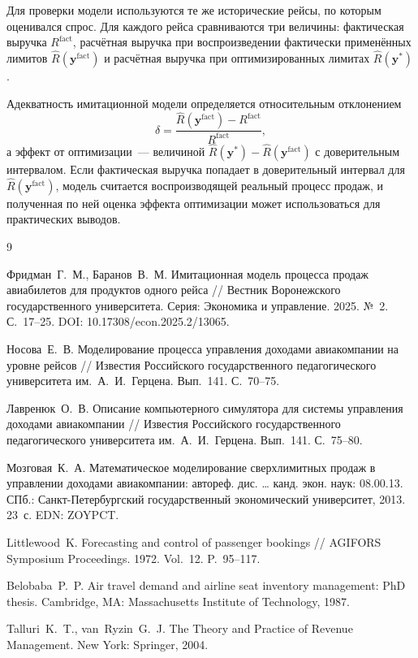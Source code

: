 \documentclass{misisarticle}
\begin{document}
Для проверки модели используются те же исторические рейсы, по которым оценивался спрос. Для каждого рейса сравниваются три величины: фактическая выручка $R^{\text{fact}}$, расчётная выручка при воспроизведении фактически применённых лимитов $\hat{R}(\mathbf{y}^{\text{fact}})$ и расчётная выручка при оптимизированных лимитах $\hat{R}(\mathbf{y}^{*})$.

Адекватность имитационной модели определяется относительным отклонением
\begin{equation}
  \delta = \frac{\hat{R}(\mathbf{y}^{\text{fact}}) - R^{\text{fact}}}{R^{\text{fact}}},
  \label{eq:delta}
\end{equation}
а эффект от оптимизации~--- величиной $\hat{R}(\mathbf{y}^{*}) - \hat{R}(\mathbf{y}^{\text{fact}})$ с доверительным интервалом. Если фактическая выручка попадает в доверительный интервал для $\hat{R}(\mathbf{y}^{\text{fact}})$, модель считается воспроизводящей реальный процесс продаж, и полученная по ней оценка эффекта оптимизации может использоваться для практических выводов.

\begin{thebibliography}{9}

 Фридман~Г.~М., Баранов~В.~М. Имитационная модель процесса продаж авиабилетов для продуктов одного рейса // Вестник Воронежского государственного университета. Серия: Экономика и управление. 2025. №~2. С.~17--25. DOI: 10.17308/econ.2025.2/13065.

 Носова~Е.~В. Моделирование процесса управления доходами авиакомпании на уровне рейсов // Известия Российского государственного педагогического университета им.~А.~И.~Герцена. Вып.~141. С.~70--75.

 Лавренюк~О.~В. Описание компьютерного симулятора для системы управления доходами авиакомпании // Известия Российского государственного педагогического университета им.~А.~И.~Герцена. Вып.~141. С.~75--80.

 Мозговая~К.~А. Математическое моделирование сверхлимитных продаж в управлении доходами авиакомпании: автореф. дис. \dots{} канд. экон. наук: 08.00.13. СПб.: Санкт-Петербургский государственный экономический университет, 2013. 23~с. EDN: ZOYPCT.

 Littlewood~K. Forecasting and control of passenger bookings // AGIFORS Symposium Proceedings. 1972. Vol.~12. P.~95--117.

 Belobaba~P.~P. Air travel demand and airline seat inventory management: PhD thesis. Cambridge, MA: Massachusetts Institute of Technology, 1987.

 Talluri~K.~T., van~Ryzin~G.~J. The Theory and Practice of Revenue Management. New York: Springer, 2004.

\end{thebibliography}
\end{document}
